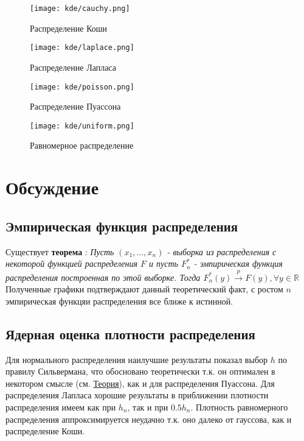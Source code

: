 \documentclass[12pt,a4paper]{article}
\begin{document}
\begin{figure}[h!]
	\centering
	\texttt{[image: kde/cauchy.png]}
	\caption{Распределение Коши}
	\label{fig:image}
\end{figure}
\pagebreak

\begin{figure}[h!]
	\centering
	\texttt{[image: kde/laplace.png]}
	\caption{Распределение Лапласа}
	\label{fig:image}
\end{figure}
\pagebreak

\begin{figure}[h!]
	\centering
	\texttt{[image: kde/poisson.png]}
	\caption{Распределение Пуассона}
	\label{fig:image}
\end{figure}
\pagebreak

\begin{figure}[h!]
	\centering
	\texttt{[image: kde/uniform.png]}
	\caption{Равномерное распределение}
	\label{fig:image}
\end{figure}
\pagebreak

\section{Обсуждение}
\subsection{Эмпирическая функция распределения}
Существует \textbf{теорема} \cite{chernova}: \textit{Пусть $(x_1, ..., x_n)$ - выборка из распределения с некоторой функцией распределения $F$ и пусть $F_n^*$ - эмпирическая функция распределения построенная по этой выборке. Тогда $F_n^*(y) \overset{p}{\to} F(y), \forall y \in \mathbb{R}$} Полученные графики подтверждают данный теоретический факт, с ростом $n$ эмпирическая функцяи распределения все ближе к истинной. 

\subsection{Ядерная оценка плотности распределения}
Для нормального распределения наилучшие результаты показал выбор $h$ по правилу Сильвермана, что обосновано теоретически т.к. он оптимален в некотором смысле (см. \hyperref[silverman]{Теория}), как и для распределения Пуассона. Для распределения Лапласа хорошие результаты в приближении плотности распределения имеем как при $h_n$, так и при $0.5h_n$. Плотность равномерного распределения аппроксимируется неудачно т.к. оно далеко от гауссова, как и распределение Коши.
\pagebreak
\end{document}

